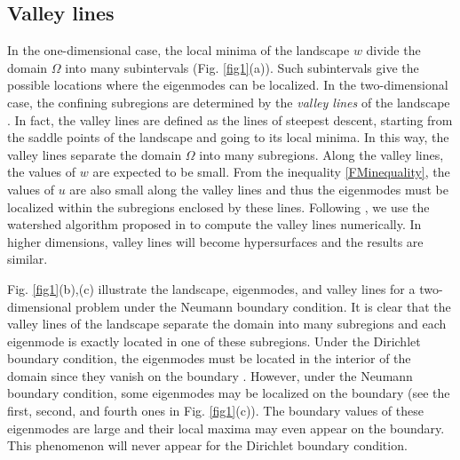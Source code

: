 \documentclass[a4paper,11pt]{article}
\begin{document}
\subsection{Valley lines}
In the one-dimensional case, the local minima of the landscape $w$ divide the domain $\Omega$ into many subintervals (Fig. \ref{fig1}(a)). Such subintervals give the possible locations where the eigenmodes can be localized. In the two-dimensional case, the confining subregions are determined by the \emph{valley lines} of the landscape \cite{filoche2012universal}. In fact, the valley lines are defined as the lines of steepest descent, starting from the saddle points of the landscape and going to its local minima. In this way, the valley lines separate the domain $\Omega$ into many subregions. Along the valley lines, the values of $w$ are expected to be small. From the inequality \eqref{FMinequality}, the values of $u$ are also small along the valley lines and thus the eigenmodes must be localized within the subregions enclosed by these lines.
Following \cite{filoche2012universal, arnold2016effective}, we use the watershed algorithm proposed in \cite{Soille1990Determining} to compute the valley lines numerically. In higher dimensions, valley lines will become hypersurfaces and the results are similar.

Fig. \ref{fig1}(b),(c) illustrate the landscape, eigenmodes, and valley lines for a two-dimensional problem under the Neumann boundary condition. It is clear that the valley lines of the landscape separate the domain into many subregions and each eigenmode is exactly located in one of these subregions. Under the Dirichlet boundary condition, the eigenmodes must be located in the interior of the domain since they vanish on the boundary \cite{filoche2012universal}. However, under the Neumann boundary condition, some eigenmodes may be localized on the boundary (see the first, second, and fourth ones in Fig. \ref{fig1}(c)). The boundary values of these eigenmodes are large and their local maxima may even appear on the boundary. This phenomenon will never appear for the Dirichlet boundary condition.
\end{document}
